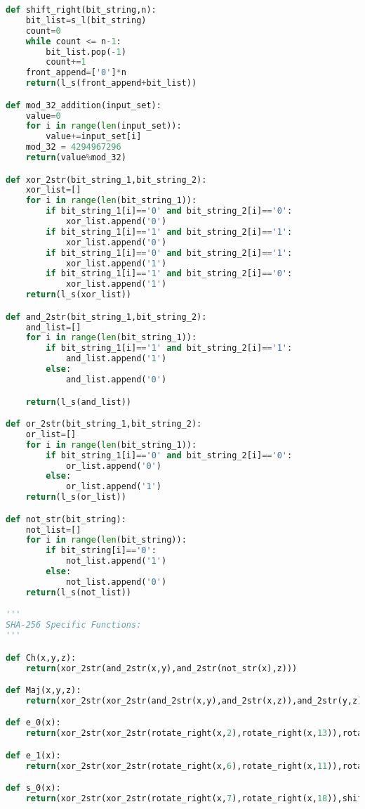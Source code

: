 \documentclass[12pt]{article}
\begin{document}
\begin{lstlisting}[language=Python]
def shift_right(bit_string,n):
    bit_list=s_l(bit_string)
    count=0
    while count <= n-1:
        bit_list.pop(-1)
        count+=1
    front_append=['0']*n
    return(l_s(front_append+bit_list))

def mod_32_addition(input_set):
    value=0
    for i in range(len(input_set)):
        value+=input_set[i]
    mod_32 = 4294967296
    return(value%mod_32)

def xor_2str(bit_string_1,bit_string_2):
    xor_list=[]
    for i in range(len(bit_string_1)):
        if bit_string_1[i]=='0' and bit_string_2[i]=='0':
            xor_list.append('0')
        if bit_string_1[i]=='1' and bit_string_2[i]=='1':
            xor_list.append('0')
        if bit_string_1[i]=='0' and bit_string_2[i]=='1':
            xor_list.append('1')
        if bit_string_1[i]=='1' and bit_string_2[i]=='0':
            xor_list.append('1')
    return(l_s(xor_list))

def and_2str(bit_string_1,bit_string_2):
    and_list=[]
    for i in range(len(bit_string_1)):
        if bit_string_1[i]=='1' and bit_string_2[i]=='1':
            and_list.append('1')
        else:
            and_list.append('0')

    return(l_s(and_list))

def or_2str(bit_string_1,bit_string_2):
    or_list=[]
    for i in range(len(bit_string_1)):
        if bit_string_1[i]=='0' and bit_string_2[i]=='0':
            or_list.append('0')
        else:
            or_list.append('1')
    return(l_s(or_list))

def not_str(bit_string):
    not_list=[]
    for i in range(len(bit_string)):
        if bit_string[i]=='0':
            not_list.append('1')
        else:
            not_list.append('0')
    return(l_s(not_list))

'''
SHA-256 Specific Functions:
'''

def Ch(x,y,z):
    return(xor_2str(and_2str(x,y),and_2str(not_str(x),z)))

def Maj(x,y,z):
    return(xor_2str(xor_2str(and_2str(x,y),and_2str(x,z)),and_2str(y,z)))

def e_0(x):
    return(xor_2str(xor_2str(rotate_right(x,2),rotate_right(x,13)),rotate_right(x,22)))

def e_1(x):
    return(xor_2str(xor_2str(rotate_right(x,6),rotate_right(x,11)),rotate_right(x,25)))

def s_0(x):
    return(xor_2str(xor_2str(rotate_right(x,7),rotate_right(x,18)),shift_right(x,3)))


\end{lstlisting}
\end{document}
